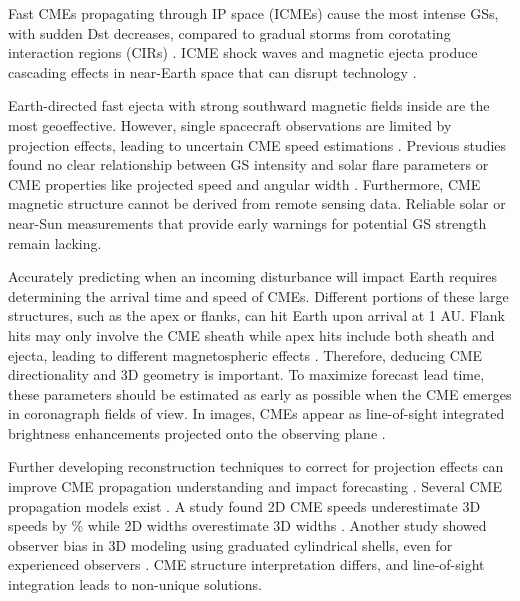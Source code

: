 Fast CMEs propagating through IP space (ICMEs) cause the most intense GSs, with sudden Dst decreases, compared to gradual storms from corotating interaction regions (CIRs) \citep{tsurutani_1997, zhang_2007, wu_2016, borovsky_2006}. ICME shock waves and magnetic ejecta produce cascading effects in near-Earth space that can disrupt technology \citep{pulkkinen_2007}.

Earth-directed fast ejecta with strong southward magnetic fields inside are the most geoeffective. However, single spacecraft observations are limited by projection effects, leading to uncertain CME speed estimations \citep{paouris_2021, kouloumvakos_2022}. Previous studies found no clear relationship between GS intensity and solar flare parameters or CME properties like projected speed and angular width \citep{samwel_2023}. Furthermore, CME magnetic structure cannot be derived from remote sensing data. Reliable solar or near-Sun measurements that provide early warnings for potential GS strength remain lacking.

Accurately predicting when an incoming disturbance will impact Earth requires determining the arrival time and speed of CMEs. Different portions of these large structures, such as the apex or flanks, can hit Earth upon arrival at 1 AU. Flank hits may only involve the CME sheath while apex hits include both sheath and ejecta, leading to different magnetospheric effects \citep{kay_2018}. Therefore, deducing CME directionality and 3D geometry is important. To maximize forecast lead time, these parameters should be estimated as early as possible when the CME emerges in coronagraph fields of view. In images, CMEs appear as line-of-sight integrated brightness enhancements projected onto the observing plane \citep{vourlidas_2003, jackson_2010}.

Further developing reconstruction techniques to correct for projection effects can improve CME propagation understanding and impact forecasting \citep{thernisien_2009, mierla_2010, wood_2010, thernisien_2011}. Several CME propagation models exist \citep{odstrcil_2004, xie_2004, vrvsnak_2013, pomoell_2018}. A study found 2D CME speeds underestimate 3D speeds by \% while 2D widths overestimate 3D widths \citep{jang_2016}. Another study showed observer bias in 3D modeling using graduated cylindrical shells, even for experienced observers \citep{verbeke_2022}. CME structure interpretation differs, and line-of-sight integration leads to non-unique solutions.

